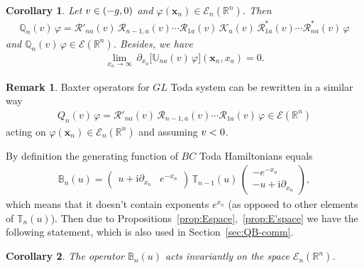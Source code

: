 \documentclass[11pt]{article}
\numberwithin{equation}{section}
\theoremstyle{plain}
\newtheorem{corollary}{Corollary}
\theoremstyle{definition}
\newtheorem{remark}{Remark}
\newcommand{\T}{\mathbb{T}}
\newcommand{\B}{\mathbb{B}}
\newcommand{\QQ}{\mathbb{Q}}
\newcommand{\MMO}{\mathbb{U}}
\let\Im\relax
\DeclareMathOperator{\Im}{Im}
\renewcommand{\phi}{\varphi}
\renewcommand{\imath}{\mathrm{i}}
\begin{document}
\begin{corollary} \label{cor:QU-lim}
	Let $\Im v \in (-g, 0)$ and $\phi(\bm{x}_n) \in \mathcal{E}_n(\mathbb{R}^n)$. Then 
	\begin{align}
		\QQ_n(v) \, \phi = \mathcal{R}'_{na}(v) \, \mathcal{R}_{n - 1 , a}(v) \cdots \mathcal{R}_{1a}(v) \, \mathcal{K}_a(v) \, \mathcal{R}^*_{1a}(v) \cdots \mathcal{R}^*_{na}(v)  \, \phi
	\end{align}
	and $\QQ_n(v) \, \phi \in \mathcal{E}(\mathbb{R}^n)$.
	Besides, we have
	\begin{align}
		\lim_{x_a \to \infty} \, \partial_{x_a}  \bigl[ \MMO_{n a}(v) \, \phi \bigr] (\bm{x}_n, x_a) = 0.
	\end{align}
\end{corollary}

\begin{remark}
	Baxter operators for $GL$ Toda system can be rewritten in a similar way 
	\begin{align}
		Q_n(v)  \, \phi = \mathcal{R}'_{na}(v) \, \mathcal{R}_{n - 1 , a}(v) \cdots \mathcal{R}_{1a}(v) \, \phi \in \mathcal{E}(\mathbb{R}^n)
	\end{align}
	acting on $ \phi(\bm{x}_n) \in \mathcal{E}_n(\mathbb{R}^n)$ and assuming $\Im v < 0$.
\end{remark}

By definition the generating function of $BC$ Toda Hamiltonians equals
\begin{align}
	\B_n(u) = 
	\begin{pmatrix}
		u + \imath \partial_{x_n} & e^{-x_n}
	\end{pmatrix}
	\, \T_{n - 1}(u) \, 
	\begin{pmatrix}
		- e^{-x_n} \\[3pt]
		- u + \imath \partial_{x_n}
	\end{pmatrix},
\end{align}
which means that it doesn't contain exponents $e^{x_n}$ (as opposed to other elements of $\T_n(u)$). Then due to Propositions~\ref{prop:Espace},~\ref{prop:E'space} we have the following statement, which is also used in Section~\ref{sec:QB-comm}.

\begin{corollary} \label{cor:BE'space}
	The operator $\B_n(u)$ acts invariantly on the space $\mathcal{E}_n(\mathbb{R}^n)$.
\end{corollary}
\end{document}
